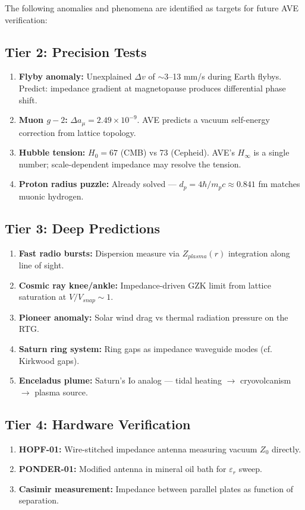 The following anomalies and phenomena are identified as targets for
future AVE verification:

\subsection{Tier 2: Precision Tests}
\begin{enumerate}
    \item \textbf{Flyby anomaly:} Unexplained $\Delta v$ of $\sim$3--13 mm/s
    during Earth flybys. Predict: impedance gradient at magnetopause
    produces differential phase shift.
    \item \textbf{Muon $g-2$:} $\Delta a_\mu = 2.49 \times 10^{-9}$.
    AVE predicts a vacuum self-energy correction from lattice topology.
    \item \textbf{Hubble tension:} $H_0 = 67$ (CMB) vs 73 (Cepheid).
    AVE's $H_\infty$ is a single number; scale-dependent impedance
    may resolve the tension.
    \item \textbf{Proton radius puzzle:} Already solved --- $d_p =
    4\hbar/m_p c \approx 0.841$ fm matches muonic hydrogen.
\end{enumerate}

\subsection{Tier 3: Deep Predictions}
\begin{enumerate}
    \item \textbf{Fast radio bursts:} Dispersion measure via
    $Z_{plasma}(r)$ integration along line of sight.
    \item \textbf{Cosmic ray knee/ankle:} Impedance-driven GZK limit
    from lattice saturation at $V/V_{snap} \sim 1$.
    \item \textbf{Pioneer anomaly:} Solar wind drag vs thermal
    radiation pressure on the RTG.
    \item \textbf{Saturn ring system:} Ring gaps as impedance waveguide
    modes (cf. Kirkwood gaps).
    \item \textbf{Enceladus plume:} Saturn's Io analog --- tidal heating
    $\to$ cryovolcanism $\to$ plasma source.
\end{enumerate}

\subsection{Tier 4: Hardware Verification}
\begin{enumerate}
    \item \textbf{HOPF-01:} Wire-stitched impedance antenna measuring
    vacuum $Z_0$ directly.
    \item \textbf{PONDER-01:} Modified antenna in mineral oil bath
    for $\varepsilon_r$ sweep.
    \item \textbf{Casimir measurement:} Impedance between parallel
    plates as function of separation.
\end{enumerate}


